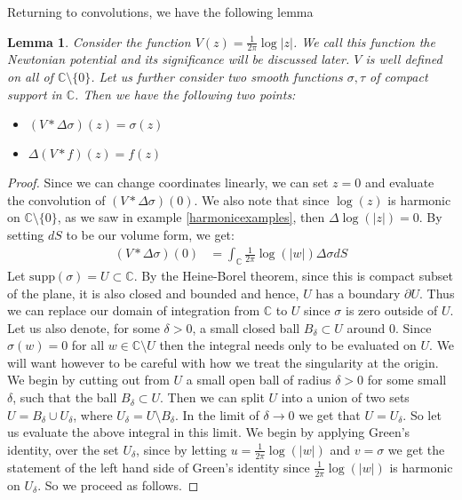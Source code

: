 \documentclass[11pt]{report}
\newtheorem{lemma}[thm]{Lemma}
\theoremstyle{definition}
\begin{document}
Returning to convolutions, we have the following lemma
\begin{lemma}\label{ConvProperties}
  Consider the function $V(z) = \frac{1}{2\pi}\log|z|$. We call this function the Newtonian potential and its significance will be discussed later. $V$ is well defined on all of $\mathbb{C}\setminus\{0\}$. Let us further consider two smooth functions $\sigma, \tau$ of compact support in $\mathbb{C}$. Then we have the following two points:
  \begin{itemize}
    \item $(V * \Delta \sigma)(z)=\sigma(z)$
    \item $\Delta(V * f)(z) = f(z)$
  \end{itemize}
\end{lemma}

\begin{proof}
  Since we can change coordinates linearly, we can set $z=0$ and evaluate the convolution of $(V * \Delta \sigma)(0)$. We also note that since $\log(z)$ is harmonic on $\mathbb{C}\setminus \{0\}$, as we saw in example \ref{harmonicexamples}, then $\Delta \log(|z|) = 0 $. By setting $dS$ to be our volume form, we get:
  \begin{align*}
    (V * \Delta \sigma)(0) &= \int_{\mathbb{C}}\frac{1}{2\pi}\log(|w|)\Delta \sigma dS
  \end{align*}
  Let $\text{supp}(\sigma) = U \subset \mathbb{C}$. By the Heine-Borel theorem, since this is compact subset of the plane, it is also closed and bounded and hence, $U$ has a boundary $\partial U$. Thus we can replace our domain of integration from $\mathbb{C}$ to $U$ since $\sigma$ is zero outside of $U$. Let us also denote, for some $\delta > 0$, a small closed ball $B_{\delta} \subset U$ around $0$. Since $\sigma(w) = 0$ for all $w \in \mathbb{C}\setminus U$ then the integral needs only to be evaluated on $U$.
  We will want however to be careful with how we treat the singularity at the origin. We begin by cutting out from $U$ a small open ball of radius $\delta >0$ for some small $\delta$, such that the ball $B_{\delta} \subset U$. Then we can split $U$ into a union of two sets $U=B_{\delta} \cup U_{\delta}$, where $U_{\delta} = U\setminus B_{\delta}$. In the limit of $\delta \rightarrow 0$ we get that $U=U_{\delta}$. So let us evaluate the above integral in this limit.
  We begin by applying Green's identity, over the set $U_{\delta}$, since by letting $u = \frac{1}{2\pi}\log(|w|)$ and $v = \sigma$ we get the statement of the left hand side of Green's identity since $\frac{1}{2\pi}\log(|w|)$ is harmonic on $U_{\delta}$. So we proceed as follows.

\end{proof}
\end{document}
